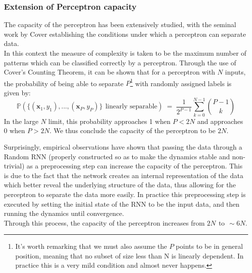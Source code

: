 \documentclass[a4paper,12pt]{report}
\begin{document}
\subsubsection*{Extension of Perceptron capacity}
The capacity of the perceptron has been extensively studied, with the seminal work by 
Cover \cite{Cover1965} establishing the conditions under which a perceptron can 
separate data.\\
In this context the measure of complexity is taken to be the maximum number of 
patterns which can be classified correctly by a perceptron. Through the use of 
Cover's Counting Theorem, it can be shown that for a perceptron with $N$ inputs, the 
probability of being able to separate $P$\footnote{
    It's worth remarking that we must also assume the $P$ points to be in general position, meaning that
no subset of size less than N is linearly dependent. In practice this is a very mild condition and 
almost never happens.\vspace{-0.25em}
} with randomly assigned labels is given by:
\begin{equation}
  \mathbb{P}\left(\{ \left(\mathbf{x}_1, y_1 \right), \text{...}, 
  \left(\mathbf{x}_P, y_P \right)\} \hspace{5pt} \text{linearly separable}\right) \;=\; 
  \frac{1}{2^{P-1}} \sum_{k=0}^{N-1} \binom{P-1}{k}
\end{equation}
In the large $N$ limit, this probability approaches 1 when $P < 2N$ and approaches 0 when 
$P > 2N$. We thus conclude the capacity of the perceptron to be $2N$.
\vspace{0.5em}

Surprisingly, empirical observations \cite{Student2024} have shown that passing the data through a 
Random RNN (properly constructed so as to make the dynamics stable and non-trivial) as a 
preprocessing step can increase the capacity of the perceptron. This is due to the fact that the 
network creates an internal representation of the data which better reveal the underlying structure 
of the data, thus allowing for the perceptron to separate the data more easily. In practice this 
preprocessing step is executed by setting the initial state of the RNN to be the input data, and 
then running the dynamics until convergence. \\
Through this process, the capacity of the perceptron increases from $2N \hspace{5pt} \text{to} 
\hspace{5pt} \sim 6N$.
\end{document}
